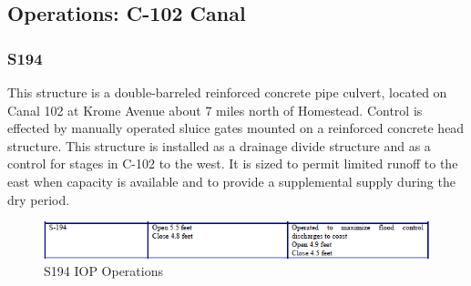 \subsection{Operations: C-102 Canal}

\subsubsection{S194}

This structure is a double-barreled reinforced concrete pipe culvert, located on Canal 102 at Krome Avenue about 7 miles north of Homestead. Control is effected by manually operated sluice gates mounted on a reinforced concrete head structure. This structure is installed as a drainage divide structure and as a control for stages in C-102 to the west. It is sized to permit limited runoff to the east when capacity is available and to provide a supplemental supply during the dry period.
%
%

\begin{figure}[!h]
  \begin{center}
  \includegraphics[width=6.5in]{../figs/S194_IOPops.png}
  \caption{S194 IOP Operations}
  \label{fig:S194iop}
  \end{center}
\end{figure}

